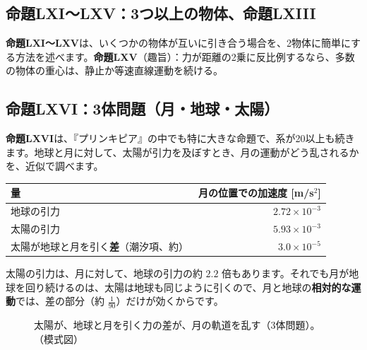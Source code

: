 \documentclass[a4paper,11pt,openany]{ltjsbook}
\begin{document}
\subsection{命題LXI〜LXV：3つ以上の物体、命題LXIII}

\textbf{命題LXI〜LXV}は、いくつかの物体が互いに引き合う場合を、2物体に簡単にする方法を述べます。\textbf{命題LXV}（趣旨）：力が距離の2乗に反比例するなら、多数の物体の重心は、静止か等速直線運動を続ける。

\subsection{命題LXVI：3体問題（月・地球・太陽）}

\textbf{命題LXVI}は、『プリンキピア』の中でも特に大きな命題で、系が20以上も続きます。地球と月に対して、太陽が引力を及ぼすとき、月の運動がどう乱されるかを、近似で調べます。

\begin{center}
\begin{tabular}{lr}
\toprule
量 & 月の位置での加速度 [m/s$^2$]\\
\midrule
地球の引力 & $2.72\times10^{-3}$\\
太陽の引力 & $5.93\times10^{-3}$\\
太陽が地球と月を引く\textbf{差}（潮汐項、約） & $3.0\times10^{-5}$\\
\bottomrule
\end{tabular}
\end{center}

太陽の引力は、月に対して、地球の引力の約 $2.2$ 倍もあります。それでも月が地球を回り続けるのは、太陽は地球も同じように引くので、月と地球の\textbf{相対的な運動}では、差の部分（約 $\frac1{90}$）だけが効くからです。

\begin{figure}[htbp]
\centering
{}
\caption{太陽が、地球と月を引く力の差が、月の軌道を乱す（3体問題）。（模式図）}
\end{figure}
\end{document}
